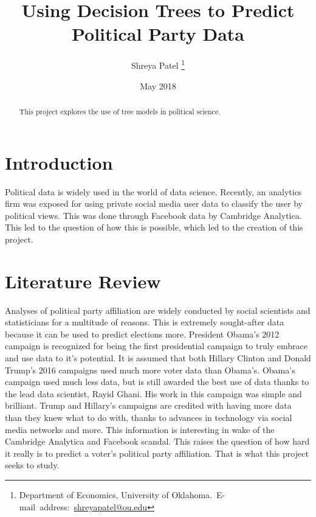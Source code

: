 \documentclass{article}
\title{Using Decision Trees to Predict Political Party Data}
\author{Shreya Patel \thanks{Department of Economics, University of Oklahoma.\
E-mail~address:~\href{mailto:
shreyapatel@ou.edu}{shreyapatel@ou.edu}}}
\date{May 2018}
\begin{document}
\maketitle



\begin{abstract}
\begin{singlespace}
This project explores the use of tree models in political science.

\end{singlespace}

\end{abstract}
\vfill{}

\vfill{}

\pagebreak{}

\section{Introduction}
Political data is widely used in the world of data science. Recently, an analytics firm was exposed for using private social media user data to classify the user by political views. This was done through Facebook data by Cambridge Analytica. This led to the question of how this is possible, which led to the creation of this project.

\section{Literature Review}
Analyses of political party affiliation are widely conducted by social scientists and statisticians for a multitude of reasons. This is extremely sought-after data because it can be used to predict elections more. President Obama's 2012 campaign is recognized for being the first presidential campaign to truly embrace and use data to it's potential. It is assumed that both Hillary Clinton and Donald Trump's 2016 campaigns used much more voter data than Obama's. Obama's campaign used much less data, but is still awarded the best use of data thanks to the lead data scientist, Rayid Ghani. His work in this campaign was simple and brilliant. Trump and Hillary's campaigns are credited with having more data than they knew what to do with, thanks to advances in technology via social media networks and more. This information is interesting in wake of the Cambridge Analytica and Facebook scandal. This raises the question of how hard it really is to predict a voter's political party affiliation. That is what this project seeks to study.
\end{document}
